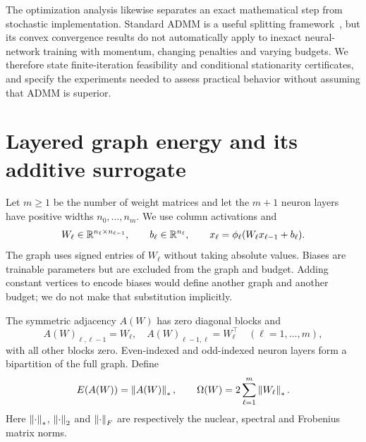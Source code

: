 The optimization analysis likewise separates an exact mathematical step from stochastic implementation. Standard ADMM is a useful splitting framework~\cite{Boyd2011ADMM}, but its convex convergence results do not automatically apply to inexact neural-network training with momentum, changing penalties and varying budgets. We therefore state finite-iteration feasibility and conditional stationarity certificates, and specify the experiments needed to assess practical behavior without assuming that ADMM is superior.

\section{Layered graph energy and its additive surrogate}\label{sec:graph}
Let $m\ge1$ be the number of weight matrices and let the $m+1$ neuron layers have positive widths $n_0,\ldots,n_m$. We use column activations and
\[
 W_\ell\in\mathbb R^{n_\ell\times n_{\ell-1}},\qquad
 b_\ell\in\mathbb R^{n_\ell},\qquad
 x_\ell=\phi_\ell(W_\ell x_{\ell-1}+b_\ell).
\]
The graph uses signed entries of $W_\ell$ without taking absolute values. Biases are trainable parameters but are excluded from the graph and budget. Adding constant vertices to encode biases would define another graph and another budget; we do not make that substitution implicitly.

The symmetric adjacency $A(W)$ has zero diagonal blocks and
\begin{equation}\label{eq:adjacency}
 A(W)_{\ell,\ell-1}=W_\ell,\quad
 A(W)_{\ell-1,\ell}=W_\ell^\top\quad(\ell=1,\ldots,m),
\end{equation}
with all other blocks zero. Even-indexed and odd-indexed neuron layers form a bipartition of the full graph. Define
\begin{equation}\label{eq:omega}
 E(A(W))=\left\lVert A(W)\right\rVert_*,\qquad
 \Omega(W)=2\sum_{\ell=1}^m\left\lVert W_\ell\right\rVert_*.
\end{equation}
Here $\left\lVert\cdot\right\rVert_*$, $\left\lVert\cdot\right\rVert_2$ and $\left\lVert\cdot\right\rVert_F$ are respectively the nuclear, spectral and Frobenius matrix norms.

